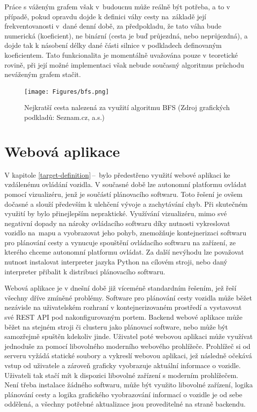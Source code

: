 \documentclass[czech, bachelor]{diploma}
\newcommand{\peteref}[1]{\ref{#1}\,--\,\nameref{#1}}
\begin{document}
Práce s váženým grafem však v~budoucnu může reálně být potřeba, a to v případě, pokud opravdu dojde k definici váhy cesty
na~základě její frekventovanosti v~dané denní době, za předpokladu, že tato váha bude numerická (koeficient), ne binární 
(cesta je buď průjezdná, nebo neprůjezdná), a dojde tak k násobení délky dané části silnice v podkladech definovaným koeficientem.
Tato funkcionalita je momentálně uvažována pouze v teoretické rovině, při její možné implementaci však nebude současný algoritmus
průchodu neváženým grafem stačit.

\begin{figure}
    \centering
    \texttt{[image: Figures/bfs.png]}
    \caption{Nejkratší cesta nalezená za využití algoritmu BFS (Zdroj grafických podkladů: Seznam.cz, a.s.)}
    \label{fig:bfs}
\end{figure}

\chapter{Webová aplikace} \label{web-app}

V kapitole \peteref{target-definition} bylo předestřeno využití webové aplikaci ke vzdálenému ovládání vozidla. V současné době
lze autonomní platformu ovládat pomocí vizualizéru, jenž je součástí plánovacího softwaru. Toto řešení je ovšem dočasné a slouží
především k ulehčení vývoje a zachytávání chyb. Při skutečném využití by bylo přinejlepším nepraktické. Využívání vizualizéru,
mimo své negativní dopady na nároky ovládacího softwaru díky nutnosti vykreslovat vozidlo na~mapu a vyobrazovat jeho pohyb,
znemožňuje kontejnerizaci softwaru pro plánování cesty a vynucuje spouštění ovládacího softwaru na zařízení, ze kterého chceme
autonomní platformu ovládat. Za další nevýhodu lze považovat nutnost instalovat interpreter jazyka Python na cílovém stroji, nebo
daný interpreter přibalit k distribuci plánovacího softwaru.

Webová aplikace je v dnešní době již víceméně standardním řešením, jež řeší všechny dříve zmíněné problémy. Software pro plánování
cesty vozidla může běžet nezávisle na uživatelském rozhraní v kontejnerizovaném prostředí a vystavovat své REST API
pod nakonfigurovaným portem. Backend webové aplikace může běžet na stejném stroji či clusteru jako plánovací software, nebo může
být samozřejmě spuštěn kdekoliv jinde. Uživatel poté webovou aplikaci může využívat jednoduše za pomocí libovolného moderního
webového prohlížeče. Prohlížeč si od serveru vyžádá statické soubory a vykreslí webovou aplikaci, jež následně očekává vstup
od uživatele a zároveň graficky vyobrazuje aktuální informace o vozidle. Uživateli tak stačí mít k dispozici libovolné zařízení
s moderním prohlížečem. Není třeba instalace žádného softwaru, může být využito libovolné zařízení, logika plánování cesty
a logika grafického vyobrazování informací o vozidle je od sebe oddělená, a všechny potřebné aktualizace jsou proveditelné
na straně backendu.
\end{document}
